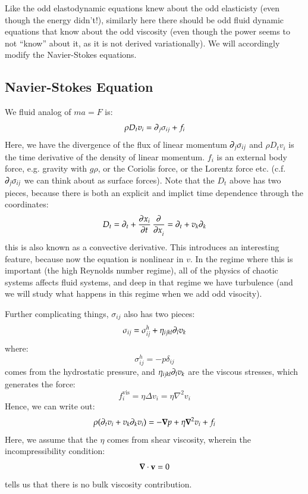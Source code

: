 Like the odd elastodynamic equations knew about the odd elasticisty (even though the energy didn't!), similarly here there should be odd fluid dynamic equations that know about the odd viscosity (even though the power seems to not ``know'' about it, as it is not derived variationally). We will accordingly modify the Navier-Stokes equations.

\subsection{Navier-Stokes Equation}
We fluid analog of $ma = F$ is:
\begin{equation}
    \rho D_t v_i = \partial_j \sigma_{ij} + f_i
\end{equation}
Here, we have the divergence of the flux of linear momentum $\partial_j \sigma_{ij}$ and $\rho D_t v_i$ is the time derivative of the density of linear momentum. $f_i$ is an external body force, e.g. gravity with $g\rho$, or the Coriolis force, or the Lorentz force etc. (c.f. $\partial_j \sigma_{ij}$ we can think about as surface forces). Note that the $D_t$ above has two pieces, because there is both an explicit and implict time dependence through the coordinates:
\begin{equation}
    D_t = \p_t + \dpd{x_i}{t}\dpd{}{x_i} = \p_t  + v_k\p_k
\end{equation}
this is also known as a convective derivative. This introduces an interesting feature, because now the equation is nonlinear in $v$. In the regime where this is important (the high Reynolds number regime), all of the physics of chaotic systems affects fluid systems, and deep in that regime we have turbulence (and we will study what happens in this regime when we add odd visocity). 

Further complicating things, $\sigma_{ij}$ also has two pieces:
\begin{equation}
    \sigma_{ij} = \sigma_{ij}^h + \eta_{ijkl}\partial_l v_k
\end{equation}
where:
\begin{equation}
    \sigma_{ij}^h = -p\delta_{ij}
\end{equation}
comes from the hydrostatic pressure, and $\eta_{ijkl}\partial_l v_k$ are the viscous stresses, which generates the force:
\begin{equation}
    f_i^{\text{vis}} = \eta \Delta v_i = \eta \nabla^2 v_i
\end{equation}
Hence, we can write out:
\begin{equation}
    \rho(\p_t v_i + v_k\p_k v_i) = -\nabla p + \eta \nabla^2 v_i + f_i
\end{equation}
Here, we assume that the $\eta$ comes from shear viscosity, wherein the incompressibility condition:
\begin{equation}
    \nabla \cdot \v{v} = 0
\end{equation}
tells us that there is no bulk viscosity contribution.


